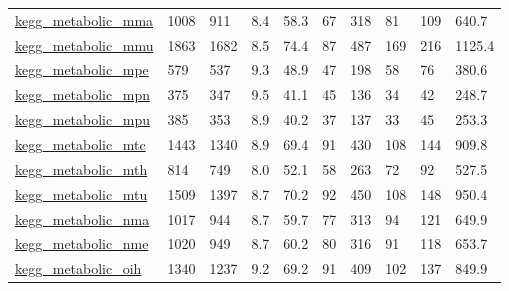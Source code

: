 \begin{longtable}{llllllllll}
 \href{http://santafe.edu/~aaronc/data/kegg2006_metabolic.zip}{kegg\_metabolic\_mma}                                          & 1008       & 911   & 8.4    & 58.3   & 67    & 318    & 81     & 109    & 640.7   \\
 \href{http://santafe.edu/~aaronc/data/kegg2006_metabolic.zip}{kegg\_metabolic\_mmu}                                          & 1863       & 1682  & 8.5    & 74.4   & 87    & 487    & 169    & 216    & 1125.4  \\
 \href{http://santafe.edu/~aaronc/data/kegg2006_metabolic.zip}{kegg\_metabolic\_mpe}                                          & 579        & 537   & 9.3    & 48.9   & 47    & 198    & 58     & 76     & 380.6   \\
 \href{http://santafe.edu/~aaronc/data/kegg2006_metabolic.zip}{kegg\_metabolic\_mpn}                                          & 375        & 347   & 9.5    & 41.1   & 45    & 136    & 34     & 42     & 248.7   \\
 \href{http://santafe.edu/~aaronc/data/kegg2006_metabolic.zip}{kegg\_metabolic\_mpu}                                          & 385        & 353   & 8.9    & 40.2   & 37    & 137    & 33     & 45     & 253.3   \\
 \href{http://santafe.edu/~aaronc/data/kegg2006_metabolic.zip}{kegg\_metabolic\_mtc}                                          & 1443       & 1340  & 8.9    & 69.4   & 91    & 430    & 108    & 144    & 909.8   \\
 \href{http://santafe.edu/~aaronc/data/kegg2006_metabolic.zip}{kegg\_metabolic\_mth}                                          & 814        & 749   & 8.0    & 52.1   & 58    & 263    & 72     & 92     & 527.5   \\
 \href{http://santafe.edu/~aaronc/data/kegg2006_metabolic.zip}{kegg\_metabolic\_mtu}                                          & 1509       & 1397  & 8.7    & 70.2   & 92    & 450    & 108    & 148    & 950.4   \\
 \href{http://santafe.edu/~aaronc/data/kegg2006_metabolic.zip}{kegg\_metabolic\_nma}                                          & 1017       & 944   & 8.7    & 59.7   & 77    & 313    & 94     & 121    & 649.9   \\
 \href{http://santafe.edu/~aaronc/data/kegg2006_metabolic.zip}{kegg\_metabolic\_nme}                                          & 1020       & 949   & 8.7    & 60.2   & 80    & 316    & 91     & 118    & 653.7   \\
 \href{http://santafe.edu/~aaronc/data/kegg2006_metabolic.zip}{kegg\_metabolic\_oih}                                          & 1340       & 1237  & 9.2    & 69.2   & 91    & 409    & 102    & 137    & 849.9   \\

\end{longtable}

